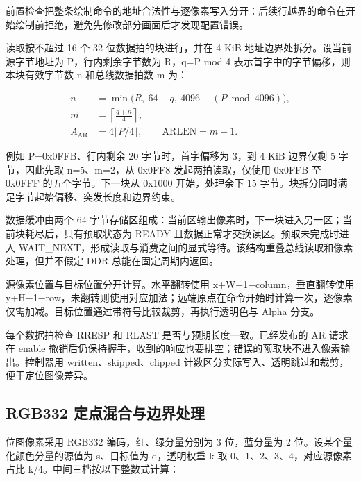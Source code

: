 \documentclass[UTF8,a4paper,12pt]{ctexart}
\begin{document}
前置检查把整条绘制命令的地址合法性与逐像素写入分开：后续行越界的命令在开始绘制前拒绝，避免先修改部分画面后才发现配置错误。\par

读取按不超过 16 个 32 位数据拍的块进行，并在 4 KiB 地址边界处拆分。设当前源字节地址为 P，行内剩余字节数为 R，q=P mod 4 表示首字中的字节偏移，则本块有效字节数 n 和总线数据拍数 m 为：\par

\[
\begin{aligned}n&=\min\bigl(R,\ 64-q,\ 4096-(P\bmod4096)\bigr),\\m&=\left\lceil\frac{q+n}{4}\right\rceil,\\A_{\mathrm{AR}}&=4\lfloor P/4\rfloor,\qquad\mathrm{ARLEN}=m-1.\end{aligned}
\]

例如 P=0x0FFB、行内剩余 20 字节时，首字偏移为 3，到 4 KiB 边界仅剩 5 字节，因此先取 n=5、m=2，从 0x0FF8 发起两拍读取，仅使用 0x0FFB 至 0x0FFF 的五个字节。下一块从 0x1000 开始，处理余下 15 字节。块拆分同时满足字节起始偏移、突发长度和边界约束。\par

数据缓冲由两个 64 字节存储区组成：当前区输出像素时，下一块进入另一区；当前块耗尽后，只有预取状态为 READY 且数据正常才交换读区。预取未完成时进入 WAIT\_NEXT，形成读取与消费之间的显式等待。该结构重叠总线读取和像素处理，但并不假定 DDR 总能在固定周期内返回。\par

源像素位置与目标位置分开计算。水平翻转使用 x+W−1−column，垂直翻转使用 y+H−1−row，未翻转则使用对应加法；远端原点在命令开始时计算一次，逐像素仅需加减。目标位置通过带符号比较裁剪，再执行透明色与 Alpha 分支。\par

每个数据拍检查 RRESP 和 RLAST 是否与预期长度一致。已经发布的 AR 请求在 enable 撤销后仍保持握手，收到的响应也要排空；错误的预取块不进入像素输出。控制器用 written、skipped、clipped 计数区分实际写入、透明跳过和裁剪，便于定位图像差异。\par

\subsection{RGB332 定点混合与边界处理}

位图像素采用 RGB332 编码，红、绿分量分别为 3 位，蓝分量为 2 位。设某个量化颜色分量的源值为 s、目标值为 d，透明权重 k 取 0、1、2、3、4，对应源像素占比 k/4。中间三档按以下整数式计算：\par
\end{document}
